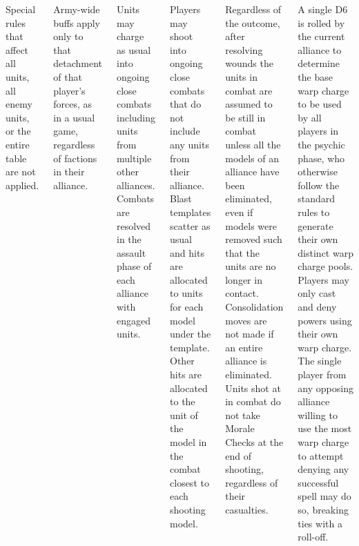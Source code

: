 \documentclass{40k}
\begin{document}
\begin{columns}
  Special rules that affect all
units, all enemy units, or the entire table are not applied.


 Army-wide buffs apply only to that
detachment of that player's forces, as in a usual game, regardless of
factions in their alliance.



 Units may charge as
usual into ongoing close combats including units from multiple other
alliances.  Combats are resolved in the assault phase of each alliance
with engaged units.


  Players may shoot into
ongoing close combats that do not include any units from their
alliance.  Blast templates scatter as usual and hits are allocated to
units for each model under the template.  Other hits are allocated to
the unit of the model in the combat closest to each shooting model.

Regardless of the outcome, after resolving wounds the units in combat
are assumed to be still in combat unless all the models of an alliance
have been eliminated, even if models were removed such that the units
are no longer in contact.  Consolidation moves are not made if an
entire alliance is eliminated.  Units shot at in combat do not take
Morale Checks at the end of shooting, regardless of their casualties.

 A single D6 is rolled by the
current alliance to determine the base warp charge to be used by all
players in the psychic phase, who otherwise follow the standard rules
to generate their own distinct warp charge pools.  Players may only
cast and deny powers using their own warp charge.  The single player
from any opposing alliance willing to use the most warp charge to
attempt denying any successful spell may do so, breaking ties with a
roll-off.



\end{columns}
\end{document}
